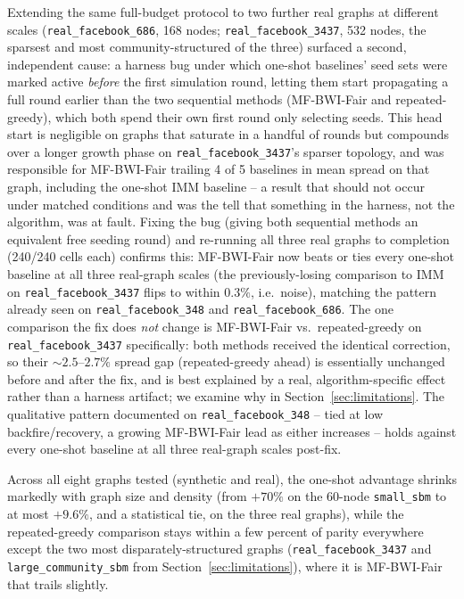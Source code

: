 \documentclass[journal]{IEEEtran}
\begin{document}
Extending the same full-budget protocol to two further real graphs at
different scales (\texttt{real\_facebook\_686}, 168 nodes;
\texttt{real\_facebook\_3437}, 532 nodes, the sparsest and most
community-structured of the three) surfaced a second, independent cause:
a harness bug under which one-shot baselines' seed sets were marked active
\emph{before} the first simulation round, letting them start propagating
a full round earlier than the two sequential methods (MF-BWI-Fair and
repeated-greedy), which both spend their own first round only selecting
seeds. This head start is negligible on graphs that saturate in a handful
of rounds but compounds over a longer growth phase on
\texttt{real\_facebook\_3437}'s sparser topology, and was responsible for
MF-BWI-Fair trailing 4 of 5 baselines in mean spread on that graph,
including the one-shot IMM baseline -- a result that should not occur
under matched conditions and was the tell that something in the harness,
not the algorithm, was at fault. Fixing the bug (giving both sequential
methods an equivalent free seeding round) and re-running all three real
graphs to completion (240/240 cells each) confirms this: MF-BWI-Fair now
beats or ties every one-shot baseline at all three real-graph scales
(the previously-losing comparison to IMM on \texttt{real\_facebook\_3437}
flips to within $0.3\%$, i.e.\ noise), matching the pattern already seen
on \texttt{real\_facebook\_348} and \texttt{real\_facebook\_686}. The one
comparison the fix does \emph{not} change is MF-BWI-Fair vs.\
repeated-greedy on \texttt{real\_facebook\_3437} specifically: both
methods received the identical correction, so their $\sim\!2.5$--$2.7\%$
spread gap (repeated-greedy ahead) is essentially unchanged before and
after the fix, and is best explained by a real, algorithm-specific
effect rather than a harness artifact; we examine why in
Section~\ref{sec:limitations}. The qualitative pattern documented on
\texttt{real\_facebook\_348} -- tied at low backfire/recovery, a growing
MF-BWI-Fair lead as either increases -- holds against every one-shot
baseline at all three real-graph scales post-fix.

Across all eight graphs tested (synthetic and real), the one-shot
advantage shrinks markedly with graph size and density (from $+70\%$ on
the 60-node \texttt{small\_sbm} to at most $+9.6\%$, and a statistical
tie, on the three real graphs), while the repeated-greedy comparison
stays within a few percent of parity everywhere except the two most
disparately-structured graphs (\texttt{real\_facebook\_3437} and
\texttt{large\_community\_sbm} from Section~\ref{sec:limitations}), where
it is MF-BWI-Fair that trails slightly.
\end{document}
